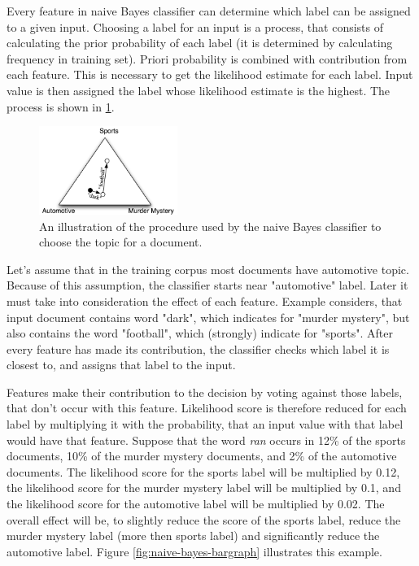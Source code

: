 \documentclass[10pt, conference, compsocconf]{IEEEtran}
\begin{document}
Every feature in naive Bayes classifier can determine which label can be assigned to a given input. Choosing a label for an input is a process, that consists of calculating the prior probability of each label (it is determined by calculating frequency in training set). Priori probability is combined with contribution from each feature. This is necessary to get the likelihood estimate for each label. Input value is then assigned the label whose likelihood estimate is the highest. The process is shown in \ref{fig:naive-bayes-triangle}.

\begin{figure}[htb]
\begin{center}
\includegraphics[width=0.4\textwidth]{naive-bayes-triangle.png} 
\end{center}
\caption{An illustration of the procedure used by the naive Bayes classifier to choose the topic for a document.}
\label{fig:naive-bayes-triangle}
\end{figure}

Let's assume that in the training corpus most documents have automotive topic. Because of this assumption, the classifier starts near "automotive" label. Later it must take into consideration the effect of each feature. Example considers, that input document contains word "dark", which indicates for "murder mystery", but also contains the word "football", which (strongly) indicate for "sports". After every feature has made its contribution, the classifier checks which label it is closest to, and assigns that label to the input.

Features make their contribution to the decision by voting against those labels, that don't occur with this feature. Likelihood score is therefore reduced for each label by multiplying it with the probability, that an input value with that label would have that feature. Suppose that the word \textit{ran} occurs in  12\% of the sports documents, 10\% of the murder mystery documents, and 2\% of the automotive documents. The likelihood score for the sports label will be multiplied by 0.12, the likelihood score for the murder mystery label will be multiplied by 0.1, and the likelihood score for the automotive label will be multiplied by 0.02. The overall effect will be, to slightly reduce the score of the sports label, reduce the murder mystery label (more then sports label) and significantly reduce the automotive label. Figure \ref{fig:naive-bayes-bargraph} illustrates this example.
\end{document}
